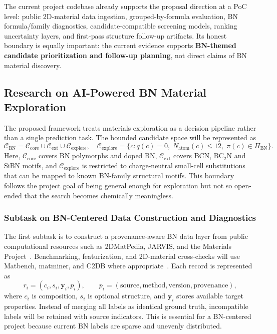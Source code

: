 \documentclass[12pt,a4paper]{article}
\begin{document}
The current project codebase already supports the proposal direction at a PoC level: public 2D-material data ingestion, grouped-by-formula evaluation, BN formula/family diagnostics, candidate-compatible screening models, ranking uncertainty layers, and first-pass structure follow-up artifacts. Its honest boundary is equally important: the current evidence supports \textbf{BN-themed candidate prioritization and follow-up planning}, not direct claims of BN material discovery.

\subsection{Research on AI-Powered BN Material Exploration}
The proposed framework treats materials exploration as a decision pipeline rather than a single prediction task. The bounded candidate space will be represented as
\[
  \mathcal{C}_{\mathrm{BN}}=
  \mathcal{C}_{\mathrm{core}}\cup\mathcal{C}_{\mathrm{ext}}\cup\mathcal{C}_{\mathrm{explore}},
  \quad
  \mathcal{C}_{\mathrm{explore}}=
  \{c:q(c)=0,\;N_{\mathrm{atom}}(c)\le 12,\;\pi(c)\in\Pi_{\mathrm{BN}}\}.
\]
Here, $\mathcal{C}_{\mathrm{core}}$ covers BN polymorphs and doped BN, $\mathcal{C}_{\mathrm{ext}}$ covers BCN, BC$_2$N and SiBN motifs, and $\mathcal{C}_{\mathrm{explore}}$ is restricted to charge-neutral small-cell substitutions that can be mapped to known BN-family structural motifs. This boundary follows the project goal of being general enough for exploration but not so open-ended that the search becomes chemically meaningless.

\subsubsection{Subtask on BN-Centered Data Construction and Diagnostics}
The first subtask is to construct a provenance-aware BN data layer from public computational resources such as 2DMatPedia, JARVIS, and the Materials Project~\cite{zhou2019_2dmatpedia,choudhary2020_jarvis,jain2013_mp}. Benchmarking, featurization, and 2D-material cross-checks will use Matbench, matminer, and C2DB where appropriate~\cite{dunn2020_matbench,ward2018_matminer,haastrup2018_c2db}. Each record is represented as
\[
  r_i=(c_i,s_i,\mathbf{y}_i,p_i),
  \qquad
  p_i=(\mathrm{source},\mathrm{method},\mathrm{version},\mathrm{provenance}),
\]
where $c_i$ is composition, $s_i$ is optional structure, and $\mathbf{y}_i$ stores available target properties. Instead of merging all labels as identical ground truth, incompatible labels will be retained with source indicators. This is essential for a BN-centered project because current BN labels are sparse and unevenly distributed.
\end{document}
